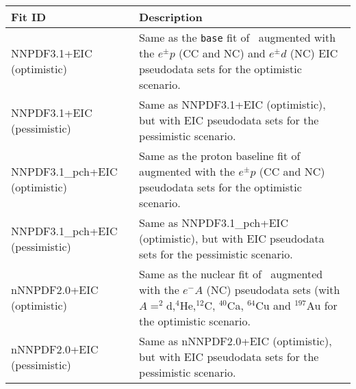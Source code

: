 \renewcommand{\arraystretch}{1.3}
\begin{tabularx}{\linewidth}{lX}
  \toprule
  Fit ID & Description \\
  \midrule
    NNPDF3.1+EIC (optimistic)
  & Same as the {\tt base} fit of~\cite{Faura:2020oom} augmented with
    the $e^\pm p$ (CC and NC) and $e^\pm d$ (NC) EIC pseudodata sets
    for the optimistic scenario. \\
    NNPDF3.1+EIC (pessimistic)
  & Same as NNPDF3.1+EIC (optimistic), but with EIC pseudodata sets for the
    pessimistic scenario. \\
  \midrule
    NNPDF3.1\_pch+EIC (optimistic)
  & Same as the proton baseline fit of~\cite{AbdulKhalek:2020yuc} augmented with
    the $e^\pm p$ (CC and NC) pseudodata sets for the optimistic scenario. \\
    NNPDF3.1\_pch+EIC (pessimistic)
  & Same as NNPDF3.1\_pch+EIC (optimistic), but with EIC pseudodata sets for
    the pessimistic scenario. \\
    nNNPDF2.0+EIC (optimistic)
  & Same as the nuclear fit of~\cite{AbdulKhalek:2020yuc} augmented with the $e^-A$ (NC) pseudodata sets (with $A=^2$d,$^4$He,$^{12}$C,
    $^{40}$Ca, $^{64}$Cu and $^{197}$Au for the optimistic scenario. \\
    nNNPDF2.0+EIC (pessimistic)
  & Same as nNNPDF2.0+EIC (optimistic), but with EIC pseudodata sets for
    the pessimistic scenario. \\
  \bottomrule
\end{tabularx}
